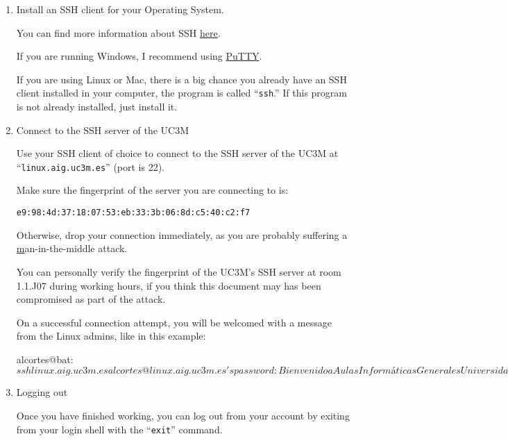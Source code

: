 \documentclass[a4paper, 12pt]{article}
\begin{document}
  \begin{enumerate}

    \item Install an SSH client for your Operating System.

      You can find more information about SSH
      \href{http://en.wikipedia.org/wiki/Secure_Shell}{here}.

      If you are running Windows, I recommend using
      \href{http://www.chiark.greenend.org.uk/~sgtatham/putty/download.html}{PuTTY}.

      If you are using Linux or Mac, there is a big chance you
      already have an SSH client installed in your computer, the program is
      called ``\texttt{ssh}.'' If this program is not already installed, just
      install it.

    \item Connect to the SSH server of the UC3M

      Use your SSH client of choice to connect to the SSH server of the UC3M at
      ``\texttt{linux.aig.uc3m.es}'' (port is 22).

      Make sure the fingerprint of the server you are connecting to is:

      \begin{center}
        \texttt{e9:98:4d:37:18:07:53:eb:33:3b:06:8d:c5:40:c2:f7}
      \end{center}

      Otherwise, drop your connection immediately, as you are probably
      suffering a
      \href{http://en.wikipedia.org/wiki/Man-in-the-middle_attackman-in-the-middle}
      man-in-the-middle attack.

      You can personally verify the fingerprint of the UC3M's SSH server at
      room 1.1.J07 during working hours, if you think this document may has
      been compromised as part of the attack.

      On a successful connection attempt, you will be welcomed with a message
      from the Linux admins, like in this example:

\begin{blackboard}
alcortes@bat:~$ ssh linux.aig.uc3m.es
alcortes@linux.aig.uc3m.es's password: 

       Bienvenido a Aulas Informáticas Generales
          Universidad Carlos III de Madrid

          Puede contactar con nosotros en:
     
                gsai@aig.uc3m.es

Last login: Tue Jan 13 13:53:33 2015 from bat.it.uc3m.es
alcortes@linux:~$
\end{blackboard}

    \item Logging out

      Once you have finished working, you can log out from
      your account by exiting from your login shell with the ``\texttt{exit}''
      command.

  \end{enumerate}
\end{document}
